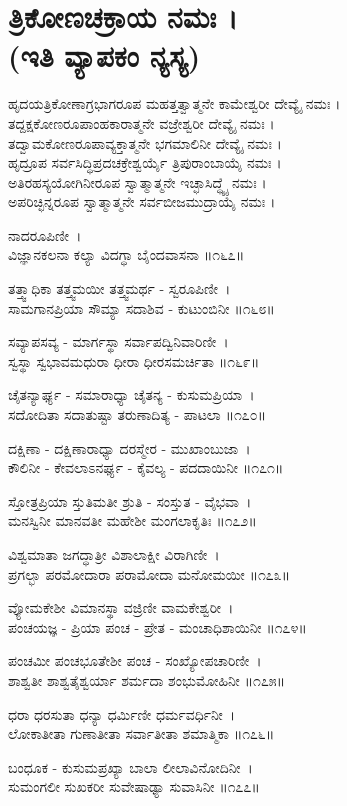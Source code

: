 \section{ತ್ರಿಕೋಣಚಕ್ರಾಯ ನಮಃ ।\\ (ಇತಿ ವ್ಯಾಪಕಂ ನ್ಯಸ್ಯ)}
ಹೃದಯತ್ರಿಕೋಣಾಗ್ರಭಾಗರೂಪ ಮಹತ್ತತ್ವಾತ್ಮನೇ ಕಾಮೇಶ್ವರೀ ದೇವ್ಯೈ ನಮಃ ।\\
ತದ್ದಕ್ಷಕೋಣರೂಪಾಂಹಕಾರಾತ್ಮನೇ ವಜ್ರೇಶ್ವರೀ ದೇವ್ಯೈ ನಮಃ ।\\
ತದ್ವಾಮಕೋಣರೂಪಾವ್ಯಕ್ತಾತ್ಮನೇ ಭಗಮಾಲಿನೀ ದೇವ್ಯೈ ನಮಃ ।\\
ಹೃದ್ರೂಪ ಸರ್ವಸಿದ್ಧಿಪ್ರದಚಕ್ರೇಶ್ವರ್ಯೈ ತ್ರಿಪುರಾಂಬಾಯೈ ನಮಃ ।\\
ಅತಿರಹಸ್ಯಯೋಗಿನೀರೂಪ ಸ್ವಾತ್ಮಾತ್ಮನೇ ಇಚ್ಛಾಸಿದ್ಧ್ಯೈ ನಮಃ ।\\
ಅಪರಿಚ್ಛಿನ್ನರೂಪ ಸ್ವಾತ್ಮಾತ್ಮನೇ ಸರ್ವಬೀಜಮುದ್ರಾಯೈ ನಮಃ ।

ನಾದರೂಪಿಣೀ~।\\
ವಿಜ್ಞಾನಕಲನಾ ಕಲ್ಯಾ ವಿದಗ್ಧಾ ಬೈಂದವಾಸನಾ ॥೧೬೭॥

ತತ್ತ್ವಾಧಿಕಾ ತತ್ತ್ವಮಯೀ ತತ್ತ್ವಮರ್ಥ - ಸ್ವರೂಪಿಣೀ~।\\
ಸಾಮಗಾನಪ್ರಿಯಾ ಸೌಮ್ಯಾ ಸದಾಶಿವ - ಕುಟುಂಬಿನೀ ॥೧೬೮॥

ಸವ್ಯಾಪಸವ್ಯ - ಮಾರ್ಗಸ್ಥಾ ಸರ್ವಾಪದ್ವಿನಿವಾರಿಣೀ~।\\
ಸ್ವಸ್ಥಾ ಸ್ವಭಾವಮಧುರಾ ಧೀರಾ ಧೀರಸಮರ್ಚಿತಾ ॥೧೬೯॥

ಚೈತನ್ಯಾರ್ಘ್ಯ - ಸಮಾರಾಧ್ಯಾ ಚೈತನ್ಯ - ಕುಸುಮಪ್ರಿಯಾ~।\\
ಸದೋದಿತಾ ಸದಾತುಷ್ಟಾ ತರುಣಾದಿತ್ಯ - ಪಾಟಲಾ ॥೧೭೦॥

ದಕ್ಷಿಣಾ - ದಕ್ಷಿಣಾರಾಧ್ಯಾ ದರಸ್ಮೇರ - ಮುಖಾಂಬುಜಾ~।\\
ಕೌಲಿನೀ - ಕೇವಲಾಽನರ್ಘ್ಯ - ಕೈವಲ್ಯ - ಪದದಾಯಿನೀ ॥೧೭೧॥

ಸ್ತೋತ್ರಪ್ರಿಯಾ ಸ್ತುತಿಮತೀ ಶ್ರುತಿ - ಸಂಸ್ತುತ - ವೈಭವಾ~।\\
ಮನಸ್ವಿನೀ ಮಾನವತೀ ಮಹೇಶೀ ಮಂಗಲಾಕೃತಿಃ ॥೧೭೨॥

ವಿಶ್ವಮಾತಾ ಜಗದ್ಧಾತ್ರೀ ವಿಶಾಲಾಕ್ಷೀ ವಿರಾಗಿಣೀ~।\\
ಪ್ರಗಲ್ಭಾ ಪರಮೋದಾರಾ ಪರಾಮೋದಾ ಮನೋಮಯೀ ॥೧೭೩॥

ವ್ಯೋಮಕೇಶೀ ವಿಮಾನಸ್ಥಾ ವಜ್ರಿಣೀ ವಾಮಕೇಶ್ವರೀ~।\\
ಪಂಚಯಜ್ಞ - ಪ್ರಿಯಾ ಪಂಚ - ಪ್ರೇತ - ಮಂಚಾಧಿಶಾಯಿನೀ ॥೧೭೪॥

ಪಂಚಮೀ ಪಂಚಭೂತೇಶೀ ಪಂಚ - ಸಂಖ್ಯೋಪಚಾರಿಣೀ~।\\
ಶಾಶ್ವತೀ ಶಾಶ್ವತೈಶ್ವರ್ಯಾ ಶರ್ಮದಾ ಶಂಭುಮೋಹಿನೀ ॥೧೭೫॥

ಧರಾ ಧರಸುತಾ ಧನ್ಯಾ ಧರ್ಮಿಣೀ ಧರ್ಮವರ್ಧಿನೀ~।\\
ಲೋಕಾತೀತಾ ಗುಣಾತೀತಾ ಸರ್ವಾತೀತಾ ಶಮಾತ್ಮಿಕಾ ॥೧೭೬॥

ಬಂಧೂಕ - ಕುಸುಮಪ್ರಖ್ಯಾ ಬಾಲಾ ಲೀಲಾವಿನೋದಿನೀ~।\\
ಸುಮಂಗಲೀ ಸುಖಕರೀ ಸುವೇಷಾಢ್ಯಾ ಸುವಾಸಿನೀ ॥೧೭೭॥


